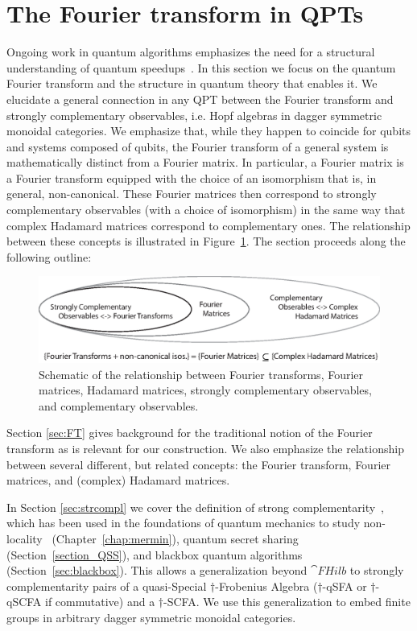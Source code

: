 \section{The Fourier transform in QPTs}
\label{sec:strcomplFT}

Ongoing work in quantum algorithms emphasizes the need for a structural understanding of quantum speedups~\cite{aaronson2014need}. In this section we focus on the quantum Fourier transform and the structure in quantum theory that enables it. We elucidate a general connection in any QPT between the Fourier transform and strongly complementary observables, i.e. Hopf algebras in dagger symmetric monoidal categories. We emphasize that, while they happen to coincide for qubits and systems composed of qubits, the Fourier transform of a general system is mathematically distinct from a Fourier matrix.  In particular, a Fourier matrix is a Fourier transform equipped with the choice of an isomorphism that is, in general, non-canonical. These Fourier matrices then correspond to strongly complementary observables (with a choice of isomorphism) in the same way that complex Hadamard matrices correspond to complementary ones. The relationship between these concepts is illustrated in Figure~\ref{fig:FTtoHrelationship}. The section proceeds along the following outline:

\begin{figure}
\includegraphics[width=\linewidth]{images/ftschematic.eps}
\caption{Schematic of the relationship between Fourier transforms, Fourier matrices, Hadamard matrices, strongly complementary observables, and complementary observables.}
\label{fig:FTtoHrelationship}
\end{figure}

Section \ref{sec:FT} gives background for the traditional notion of the Fourier transform as is relevant for our construction.  We also emphasize the relationship between several different, but related concepts: the Fourier transform, Fourier matrices, and (complex) Hadamard matrices.

In Section \ref{sec:strcompl} we cover the definition of strong complementarity~\cite{coecke2011interacting}, which has been used in the foundations of quantum mechanics to study non-locality~\cite{coecke2012strong, gogioso2015mermin} (Chapter~\ref{chap:mermin}), quantum secret sharing~\cite{gogioso2015mermin, zamdzhiev2012abstract} (Section~\ref{section_QSS}), and blackbox quantum algorithms~\cite{vicary-tqa, zeng2014abstract, zeng2015models} (Section~\ref{sec:blackbox}). This allows a generalization beyond $\cat{FHilb}$ to strongly complementarity pairs of a quasi-Special $\dagger$-Frobenius Algebra ($\dagger$-qSFA or $\dagger$-qSCFA if commutative) and a $\dagger$-SCFA. We use this generalization to embed finite groups in arbitrary dagger symmetric monoidal categories.

